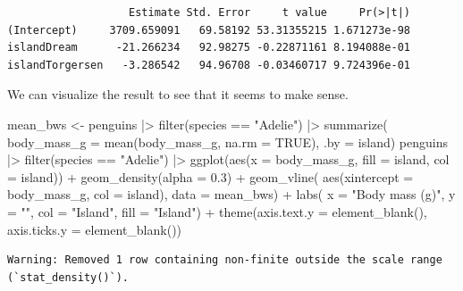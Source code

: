 \documentclass[
  letterpaper,
  DIV=11,
  numbers=noendperiod]{scrreprt}
\newenvironment{Shaded}{\begin{snugshade}}{\end{snugshade}}
\newcommand{\AttributeTok}[1]{\textcolor[rgb]{0.40,0.45,0.13}{#1}}
\newcommand{\ConstantTok}[1]{\textcolor[rgb]{0.56,0.35,0.01}{#1}}
\newcommand{\FloatTok}[1]{\textcolor[rgb]{0.68,0.00,0.00}{#1}}
\newcommand{\FunctionTok}[1]{\textcolor[rgb]{0.28,0.35,0.67}{#1}}
\newcommand{\NormalTok}[1]{\textcolor[rgb]{0.00,0.23,0.31}{#1}}
\newcommand{\OtherTok}[1]{\textcolor[rgb]{0.00,0.23,0.31}{#1}}
\newcommand{\SpecialCharTok}[1]{\textcolor[rgb]{0.37,0.37,0.37}{#1}}
\newcommand{\StringTok}[1]{\textcolor[rgb]{0.13,0.47,0.30}{#1}}
\begin{document}
\begin{verbatim}
                   Estimate Std. Error     t value     Pr(>|t|)
(Intercept)     3709.659091   69.58192 53.31355215 1.671273e-98
islandDream      -21.266234   92.98275 -0.22871161 8.194088e-01
islandTorgersen   -3.286542   94.96708 -0.03460717 9.724396e-01
\end{verbatim}

We can visualize the result to see that it seems to make sense.

\begin{Shaded}
\begin{Highlighting}[]
\NormalTok{mean\_bws }\OtherTok{\textless{}{-}}\NormalTok{ penguins }\SpecialCharTok{|\textgreater{}} 
  \FunctionTok{filter}\NormalTok{(species }\SpecialCharTok{==} \StringTok{"Adelie"}\NormalTok{) }\SpecialCharTok{|\textgreater{}}  
  \FunctionTok{summarize}\NormalTok{(}
    \AttributeTok{body\_mass\_g =} \FunctionTok{mean}\NormalTok{(body\_mass\_g, }\AttributeTok{na.rm =} \ConstantTok{TRUE}\NormalTok{),}
    \AttributeTok{.by =}\NormalTok{ island)}
\NormalTok{penguins }\SpecialCharTok{|\textgreater{}} 
  \FunctionTok{filter}\NormalTok{(species }\SpecialCharTok{==} \StringTok{"Adelie"}\NormalTok{) }\SpecialCharTok{|\textgreater{}}  
  \FunctionTok{ggplot}\NormalTok{(}\FunctionTok{aes}\NormalTok{(}\AttributeTok{x =}\NormalTok{ body\_mass\_g, }\AttributeTok{fill =}\NormalTok{ island, }\AttributeTok{col =}\NormalTok{ island)) }\SpecialCharTok{+} 
  \FunctionTok{geom\_density}\NormalTok{(}\AttributeTok{alpha =} \FloatTok{0.3}\NormalTok{) }\SpecialCharTok{+}
  \FunctionTok{geom\_vline}\NormalTok{(}
    \FunctionTok{aes}\NormalTok{(}\AttributeTok{xintercept =}\NormalTok{ body\_mass\_g,}
        \AttributeTok{col =}\NormalTok{ island),}
    \AttributeTok{data =}\NormalTok{ mean\_bws) }\SpecialCharTok{+}
  \FunctionTok{labs}\NormalTok{(}
    \AttributeTok{x =} \StringTok{"Body mass (g)"}\NormalTok{,}
    \AttributeTok{y =} \StringTok{""}\NormalTok{,}
    \AttributeTok{col =} \StringTok{"Island"}\NormalTok{,}
    \AttributeTok{fill =} \StringTok{"Island"}\NormalTok{) }\SpecialCharTok{+}
  \FunctionTok{theme}\NormalTok{(}\AttributeTok{axis.text.y =} \FunctionTok{element\_blank}\NormalTok{(),}
        \AttributeTok{axis.ticks.y =} \FunctionTok{element\_blank}\NormalTok{())}
\end{Highlighting}
\end{Shaded}

\begin{verbatim}
Warning: Removed 1 row containing non-finite outside the scale range
(`stat_density()`).
\end{verbatim}
\end{document}
